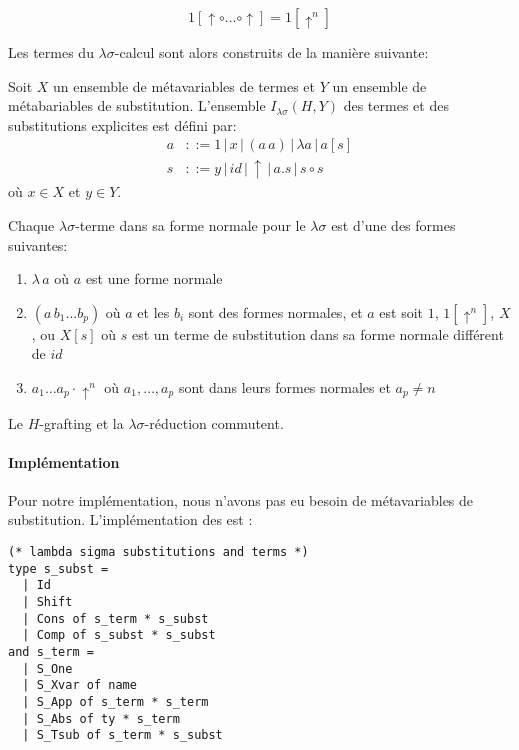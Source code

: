 \[1 [\uparrow \circ \dots \circ \uparrow] = 1 [ \uparrow^n] \]

Les termes du $\lambda \sigma$-calcul sont alors construits de la manière suivante:

\begin{defn}
Soit $X$ un ensemble de métavariables de termes et $Y$ un ensemble de métabariables de substitution. L'ensemble $I_{\lambda \sigma}(H,Y)$ des termes et des substitutions explicites est défini par:
\begin{align*}
a &::= 1 \, | \, x \, | \, (a \, a) \,| \, \lambda a \, | \, a[s] \\
s &::= y \, | \, id \, | \, \uparrow \,| \, a.s \, | \, s \circ s
\end{align*}
où $x \in X$ et $y \in Y$.
\end{defn}

\begin{prop}
Chaque $\lambda \sigma$-terme dans sa forme normale pour le $\lambda \sigma$ est d'une des formes suivantes:
\begin{enumerate}
    \item $\lambda \, a$ où $a$ est une forme normale
    \item $(a \, b_1 \dots b_p)$ où $a$ et les $b_i$ sont des formes normales, et $a$ est soit $1$, $1[\uparrow^n]$, $X$, ou $X[s]$ où $s$ est un terme de substitution dans sa forme normale différent de $id$
    \item $a_1 \dots a_p \cdot \uparrow^n$ où $a_1, \dots ,a_p$ sont dans leurs formes normales et $a_p \neq n$
\end{enumerate}
\end{prop}

\begin{prop}
Le $H$-grafting et la $\lambda \sigma$-réduction commutent.
\end{prop}

\paragraph{Implémentation}

Pour notre implémentation, nous n'avons pas eu besoin de métavariables de substitution. L'implémentation des \lsterm{} est :
\begin{lstlisting}
(* lambda sigma substitutions and terms *)
type s_subst =
  | Id
  | Shift
  | Cons of s_term * s_subst
  | Comp of s_subst * s_subst
and s_term =
  | S_One
  | S_Xvar of name
  | S_App of s_term * s_term
  | S_Abs of ty * s_term
  | S_Tsub of s_term * s_subst
\end{lstlisting}